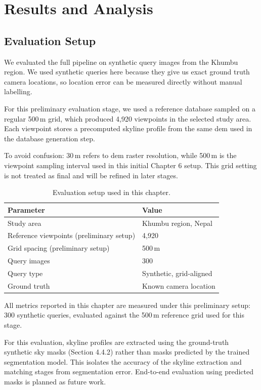 \chapter{Results and Analysis}

\section{Evaluation Setup}

We evaluated the full pipeline on synthetic query images from the Khumbu region. We used synthetic queries here because they give us exact ground truth camera locations, so location error can be measured directly without manual labelling.

For this preliminary evaluation stage, we used a reference database sampled on a regular 500\,m grid, which produced 4,920 viewpoints in the selected study area. Each viewpoint stores a precomputed skyline profile from the same \gls{dem} used in the database generation step.

To avoid confusion: 30\,m refers to \gls{dem} raster resolution, while 500\,m is the viewpoint sampling interval used in this initial Chapter 6 setup. This grid setting is not treated as final and will be refined in later stages.

\begin{table}[H]
\centering
\caption{Evaluation setup used in this chapter.}
\label{tab:evaluation_setup_results}
\begin{tabular}{ll}
\toprule
Parameter & Value\\
\midrule
Study area & Khumbu region, Nepal\\
Reference viewpoints (preliminary setup) & 4,920\\
Grid spacing (preliminary setup) & 500\,m\\
Query images & 300\\
Query type & Synthetic, grid-aligned\\
Ground truth & Known camera location\\
\bottomrule
\end{tabular}
\end{table}

All metrics reported in this chapter are measured under this preliminary setup: 300 synthetic queries, evaluated against the 500\,m reference grid used for this stage.

For this evaluation, skyline profiles are extracted using the ground-truth synthetic sky masks (Section 4.4.2) rather than masks predicted by the trained segmentation model. This isolates the accuracy of the skyline extraction and matching stages from segmentation error. End-to-end evaluation using predicted masks is planned as future work.

